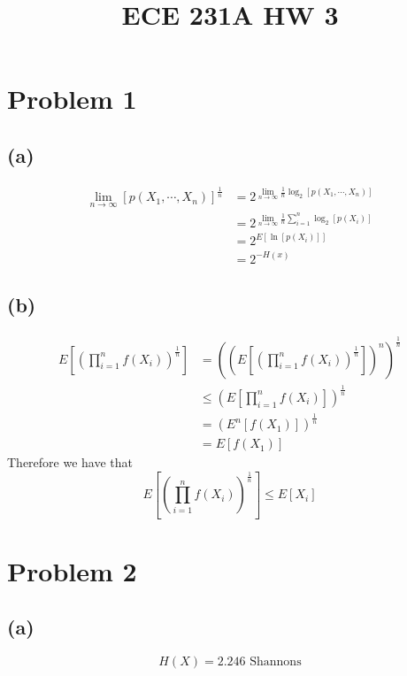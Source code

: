
\title{ECE 231A HW 3}

\maketitle
\section*{Problem 1}
\subsection*{(a)}
\begin{align*}
    \lim_{n\to\infty}[p(X_1,\cdots,X_n)]^{\frac{1}{n}}&=
        2^{\lim_{n\to\infty}\frac{1}{n}\log_2[p(X_1,\cdots,X_n)]}\\
    &=2^{\lim_{n\to\infty}\frac{1}{n}\sum_{i=1}^n\log_2[p(X_i)]}\\
    &=2^{E[\ln[p(X_i)]]}\\
    &=\boxed{2^{-H(x)}}
\end{align*}
\subsection*{(b)}
\begin{align*}
    E\left[\left(\prod_{i=1}^nf(X_i)\right)^{\frac{1}{n}}\right]&=
        \left(\left(E\left[\left(\prod_{i=1}^nf(X_i)\right)^{\frac{1}{n}}\right]\right)^{n}\right)^{\frac{1}{n}}\\
        &\leq \left(E\left[\prod_{i=1}^nf(X_i)\right]\right)^{\frac{1}{n}}\\
        &=\left(E^n[f(X_1)]\right)^{\frac{1}{n}}\\
        &=E[f(X_1)]
\end{align*}
Therefore we have that
$$
    \boxed{E\left[\left(\prod_{i=1}^nf(X_i)\right)^{\frac{1}{n}}\right]\leq E[X_i]}
    $$
\section*{Problem 2}
\subsection*{(a)}
$$H(X)=\boxed{2.246 \text{ Shannons}}$$
